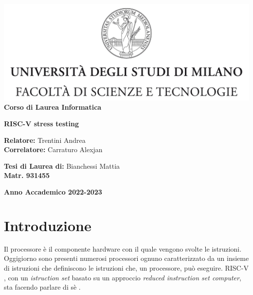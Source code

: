 \documentclass[12pt,a4paper]{report}
\begin{document}
\begin{titlepage}
\begin{center}
\includegraphics[width=\textwidth]{Img/Logo.jpg}\\
{\large{\bf Corso di Laurea Informatica}}
\end{center}
\vspace{12mm}
\begin{center}

\vspace{4mm}
{\huge{\bf RISC-V stress testing}}\\
\vspace{4mm}

\end{center}
\vspace{12mm}
\begin{flushleft}
{\large{\bf Relatore:}}
{\large{Trentini Andrea}}\\
\vspace{4mm}
{\large{\bf Correlatore:}}
{\large{Carraturo Alexjan}}\\
\end{flushleft}
\vspace{12mm}
\begin{flushright}
{\large{\bf Tesi di Laurea di:}}
{\large{Bianchessi Mattia}}\\
{\large{\bf Matr. 931455}}\\
\end{flushright}
\vspace{4mm}
\begin{center}
{\large{\bf Anno Accademico 2022-2023}}
\end{center}
\end{titlepage}


\listoftodos


\tableofcontents
\listoffigures
\listoftables
\lstlistoflistings



\chapter{Introduzione}
Il processore è il componente hardware con il quale vengono svolte le istruzioni.
Oggigiorno sono presenti numerosi processori ognuno caratterizzato da un insieme di istruzioni che definiscono le istruzioni che, un processore,  può eseguire.  RISC-V , con un \textit{istruction set} basato su un approccio \textit{reduced instruction set computer}\cite{RISCOverview}, sta facendo parlare di sè
\cite{RISCVHistory}.
\end{document}

